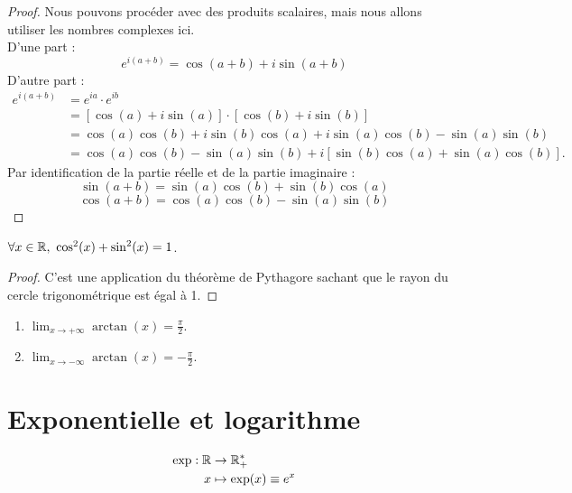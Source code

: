 \begin{proof}
    Nous pouvons procéder avec des produits scalaires, mais nous allons utiliser les nombres complexes ici.
    \\
    D'une part :
    \[e^{i (a + b)} = \cos(a + b) + i\sin(a + b)\]
    D'autre part :
    \begin{align*}
        e^{i (a + b)} &= e^{ia} \cdot e^{ib} \\
        &= [\cos(a) + i \sin(a)] \cdot [\cos(b) + i \sin(b)] \\
        &= \cos(a) \cos(b) + i\sin(b)\cos(a) + i\sin(a)\cos(b) - \sin(a)\sin(b) \\
        &= \cos(a)\cos(b) - \sin(a)\sin(b) + i [\sin(b)\cos(a) + \sin(a) \cos(b)].
    \end{align*}
    Par identification de la partie réelle et de la partie imaginaire :
    \[ \sin(a + b) = \sin(a) \cos(b) + \sin(b) \cos(a) \]
	\[ \cos(a + b) = \cos(a) \cos(b) - \sin(a) \sin(b) \]
\end{proof}

\begin{proposition}
    $\forall x \in \mathbb{R},\ \cos^2(x) + \sin^2(x) = 1$.
\end{proposition}

\begin{proof}
    C'est une application du théorème de Pythagore sachant que le rayon du cercle trigonométrique est égal à 1.
\end{proof}

\begin{proposition}
	\leavevmode
    \begin{enumerate}
        \item $\lim_{x \to +\infty} \arctan(x) = \frac{\pi}{2}$.
        \item $\lim_{x \to -\infty} \arctan(x) = -\frac{\pi}{2}$.
    \end{enumerate}
\end{proposition}

\section{Exponentielle et logarithme}

\begin{definition}
	\begin{align*}
		\exp : \mathbb{R} &\to \mathbb{R}_+^* \\
        x &\mapsto \exp(x) \equiv e^x
	\end{align*}
\end{definition}

